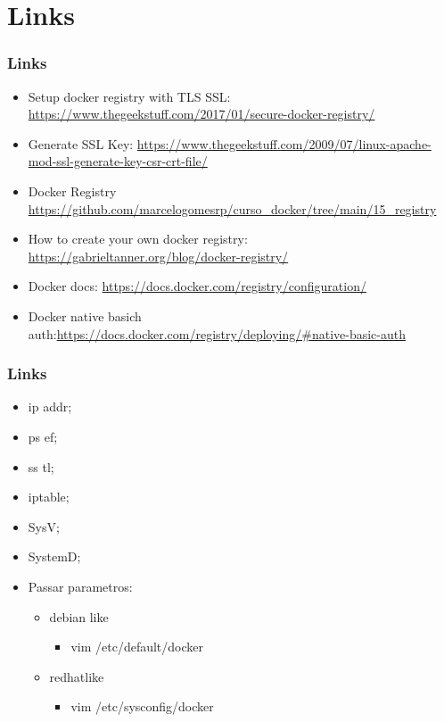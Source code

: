 \section{Links}

\begin{frame}[t]
	\frametitle{Links}
	\begin{itemize}
		\item Setup docker registry with TLS SSL: \url{https://www.thegeekstuff.com/2017/01/secure-docker-registry/}
		\item Generate SSL Key: \url{https://www.thegeekstuff.com/2009/07/linux-apache-mod-ssl-generate-key-csr-crt-file/}
		\item Docker Registry \url{https://github.com/marcelogomesrp/curso_docker/tree/main/15_registry}
		\item How to create your own docker registry: \url{https://gabrieltanner.org/blog/docker-registry/}
		\item Docker docs: \url{https://docs.docker.com/registry/configuration/}
		\item Docker native basich auth:\url{https://docs.docker.com/registry/deploying/#native-basic-auth}
	\end{itemize}
\end{frame}

\begin{frame}[t]
	\frametitle{Links}
	\begin{itemize}
		\item ip addr;
		\item ps ef;
		\item ss tl;
		\item iptable;
		\item SysV;
		\item SystemD;
		\item Passar parametros:
			\begin{itemize}
				\item debian like
					\begin{itemize}
						\item vim /etc/default/docker
					\end{itemize}
				\item redhatlike
					\begin{itemize}
						\item vim /etc/sysconfig/docker
					\end{itemize}
			\end{itemize}
	\end{itemize}
\end{frame}
